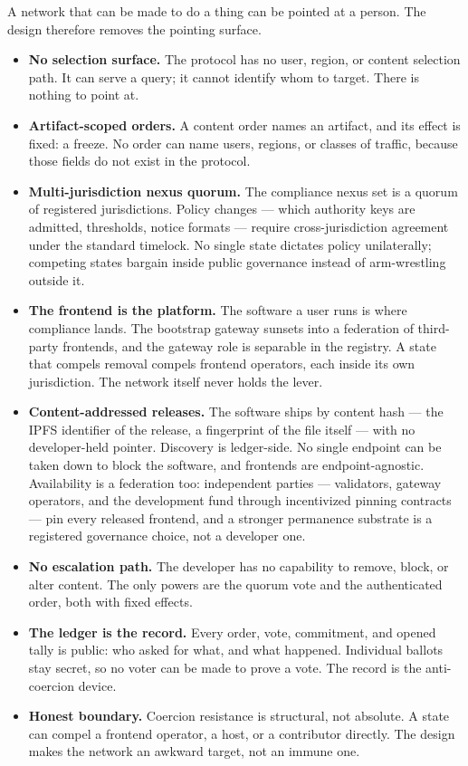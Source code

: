 \documentclass[11pt]{article}
\begin{document}
A network that can be made to do a thing can be pointed at a
person. The design therefore removes the pointing surface.

\begin{itemize}
\item \textbf{No selection surface.} The protocol has no user,
region, or content selection path. It can serve a query; it
cannot identify whom to target. There is nothing to point at.
\item \textbf{Artifact-scoped orders.} A content order names an
artifact, and its effect is fixed: a freeze. No order can name
users, regions, or classes of traffic, because those fields do
not exist in the protocol.
\item \textbf{Multi-jurisdiction nexus quorum.} The compliance
nexus set is a quorum of registered jurisdictions. Policy
changes --- which authority keys are admitted, thresholds,
notice formats --- require cross-jurisdiction agreement under
the standard timelock. No single state dictates policy
unilaterally; competing states bargain inside public governance
instead of arm-wrestling outside it.
\item \textbf{The frontend is the platform.} The software a user
runs is where compliance lands. The bootstrap gateway sunsets
into a federation of third-party frontends, and the gateway role
is separable in the registry. A state that compels removal
compels frontend operators, each inside its own jurisdiction.
The network itself never holds the lever.
\item \textbf{Content-addressed releases.} The software ships by
content hash --- the IPFS identifier of the release, a
fingerprint of the file itself --- with no developer-held
pointer. Discovery is ledger-side. No single endpoint can be
taken down to block the software, and frontends are
endpoint-agnostic. Availability is a federation too:
independent parties --- validators, gateway operators, and the
development fund through incentivized pinning contracts --- pin
every released frontend, and a stronger permanence substrate is
a registered governance choice, not a developer one.
\item \textbf{No escalation path.} The developer has no
capability to remove, block, or alter content. The only powers
are the quorum vote and the authenticated order, both with
fixed effects.
\item \textbf{The ledger is the record.} Every order, vote,
commitment, and opened tally is public: who asked for what, and
what happened. Individual ballots stay secret, so no voter can
be made to prove a vote. The record is the anti-coercion
device.
\item \textbf{Honest boundary.} Coercion resistance is
structural, not absolute. A state can compel a frontend
operator, a host, or a contributor directly. The design makes
the network an awkward target, not an immune one.
\end{itemize}
\end{document}
